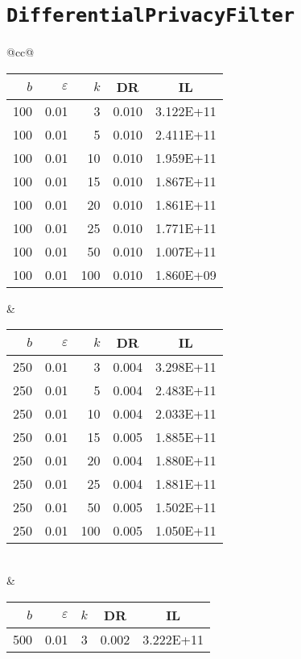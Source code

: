 \section*{\texttt{DifferentialPrivacyFilter}}

\begin{table}[H]
	\centering
	\begin{tabular}{@{}cc@{}}
		\begin{tabular}{@{}rrrrr@{}}
			\toprule
			$b$ & $\varepsilon$ & $k$ & \multicolumn{1}{c}{DR} & \multicolumn{1}{c}{IL} \\ \midrule
			100 & 0.01 & 3   & 0.010 & 3.122E+11 \\
			100 & 0.01 & 5   & 0.010 & 2.411E+11 \\
			100 & 0.01 & 10  & 0.010 & 1.959E+11 \\
			100 & 0.01 & 15  & 0.010 & 1.867E+11 \\
			100 & 0.01 & 20  & 0.010 & 1.861E+11 \\
			100 & 0.01 & 25  & 0.010 & 1.771E+11 \\
			100 & 0.01 & 50  & 0.010 & 1.007E+11 \\
			100 & 0.01 & 100 & 0.010 & 1.860E+09 \\ \bottomrule
		\end{tabular}
		&
		\begin{tabular}{@{}rrrrr@{}}
			\toprule
			$b$ & $\varepsilon$ & $k$ & \multicolumn{1}{c}{DR} & \multicolumn{1}{c}{IL} \\ \midrule
			250 & 0.01 & 3   & 0.004 & 3.298E+11 \\
			250 & 0.01 & 5   & 0.004 & 2.483E+11 \\
			250 & 0.01 & 10  & 0.004 & 2.033E+11 \\
			250 & 0.01 & 15  & 0.005 & 1.885E+11 \\
			250 & 0.01 & 20  & 0.004 & 1.880E+11 \\
			250 & 0.01 & 25  & 0.004 & 1.881E+11 \\
			250 & 0.01 & 50  & 0.005 & 1.502E+11 \\
			250 & 0.01 & 100 & 0.005 & 1.050E+11 \\ \bottomrule
		\end{tabular}
		\\ & \\
		\begin{tabular}{@{}rrrrr@{}}
			\toprule
			$b$ & $\varepsilon$ & $k$ & \multicolumn{1}{c}{DR} & \multicolumn{1}{c}{IL} \\ \midrule
			500 & 0.01 & 3   & 0.002 & 3.222E+11 \\

\end{tabular}
\end{tabular}
\end{table}
